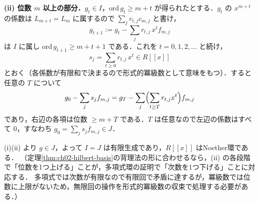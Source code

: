 \textbf{(ii) 位数 $m$ 以上の部分．}$g_t\in I$，$\mathrm{ord}\,g_t\ge m+t$ が得られたとする．$g_t$ の $x^{m+t}$ の係数は $L_{m+t}=L_m$ に属するので
$\sum_jr_{t,j}c_{m,j}$ と書け，
\[
  g_{t+1}:=g_t-\sum_jr_{t,j}\,x^tf_{m,j}
\]
は $I$ に属し $\mathrm{ord}\,g_{t+1}\ge m+t+1$ である．これを $t=0,1,2,\dots$ と続け，
\[
  s_j=\sum_{t\ge0}r_{t,j}\,x^t\in R[[x]]
\]
とおく（各係数が有限和で決まるので形式的冪級数として意味をもつ）．すると任意の $T$ について
\[
  g_0-\sum_js_jf_{m,j}=g_T-\sum_j\Bigl(\sum_{t\ge T}r_{t,j}x^t\Bigr)f_{m,j}
\]
であり，右辺の各項は位数 $\ge m+T$ である．$T$ は任意なので左辺の係数はすべて $0$，すなわち $g_0=\sum_js_jf_{m,j}\in J$．

(i)(ii) より $g\in J$，よって $I=J$ は有限生成であり，$R[[x]]$ はNoether環である．
（定理\ref{thm:ch02-hilbert-basis}の背理法の形に合わせるなら，(ii) の各段階で「位数を1つ上げる」ことが，多項式環の証明で「次数を1つ下げる」ことに対応する．
多項式では次数が有限なので有限回で矛盾に達するが，冪級数では位数に上限がないため，無限回の操作を形式的冪級数の収束で処理する必要がある．）
